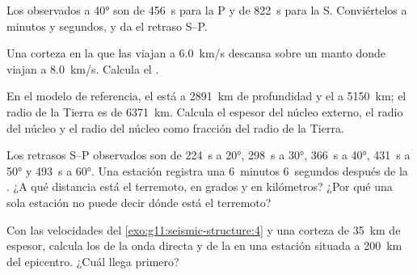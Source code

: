 \begin{exercise}[$\star$]\label{exo:g11:seismic-structure:3}
Los  observados a \ang{40} son de \qty{456}{s} para la P
y de \qty{822}{s} para la S. Conviértelos a minutos y segundos, y da el
retraso S--P.
\end{exercise}

\begin{exercise}[$\star$]\label{exo:g11:seismic-structure:4}
Una corteza en la que las  viajan a \qty{6.0}{km/s} descansa sobre un
manto donde viajan a \qty{8.0}{km/s}. Calcula el .
\end{exercise}

\begin{exercise}[$\star$]\label{exo:g11:seismic-structure:5}
En el modelo de referencia, el  está a \qty{2891}{km} de
profundidad y el  a \qty{5150}{km}; el radio de la
Tierra es de \qty{6371}{km}. Calcula el espesor del núcleo externo, el radio
del núcleo y el radio del núcleo como fracción del radio de la Tierra.
\end{exercise}

\begin{exercise}[$\star\star$]\label{exo:g11:seismic-structure:6}
Los retrasos S--P observados son de \qty{224}{s} a \ang{20}, \qty{298}{s} a
\ang{30}, \qty{366}{s} a \ang{40}, \qty{431}{s} a \ang{50} y
\qty{493}{s} a \ang{60}. Una estación registra una  6~minutos
6~segundos después de la . ¿A qué distancia está el terremoto, en grados
y en kilómetros? ¿Por qué una sola estación no puede decir dónde está el
terremoto?
\end{exercise}

\begin{exercise}[$\star\star$]\label{exo:g11:seismic-structure:7}
Con las velocidades del \cref{exo:g11:seismic-structure:4} y una corteza de
\qty{35}{km} de espesor, calcula los  de la onda directa
y de la  en una estación situada a \qty{200}{km} del epicentro.
¿Cuál llega primero?
\end{exercise}

